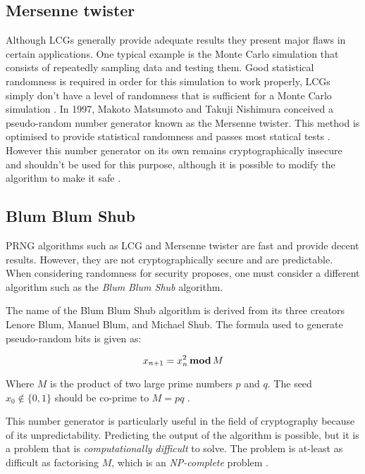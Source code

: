 \subsection{Mersenne twister}
Although LCGs generally provide adequate results they present major flaws in certain applications. One typical example is the Monte Carlo simulation that consists of repeatedly sampling data and testing them. Good statistical randomness is required in order for this simulation to work properly, LCGs simply don't have a level of randomness that is sufficient for a Monte Carlo simulation \citep{Itan-MonteCarlo}. In 1997, Makoto Matsumoto and Takuji Nishimura conceived a pseudo-random number generator known as the Mersenne twister. This method is optimised to provide statistical randomness and passes most statical tests \citep{DBLP:journals/tomacs/MatsumotoN98}. However this number generator on its own remains cryptographically insecure and shouldn't be used for this purpose, although it is possible to modify the algorithm to make it safe \citep{DBLP:journals/iacr/MatsumotoNHS05}.


\subsection{Blum Blum Shub}
PRNG algorithms such as LCG and Mersenne twister are fast and provide decent results. However, they are not cryptographically secure and are predictable. When considering randomness for security proposes, one must consider a different algorithm such as the {\em Blum Blum Shub} algorithm.

The name of the Blum Blum Shub algorithm is derived from its three creators Lenore Blum, Manuel Blum, and Michael Shub. \citep{BlumBlumShub-1} The formula used to generate pseudo-random bits is given as:

\[x_{n+1} = x^2_n \, \textbf{mod} \, M \]

Where $M$ is the product of two large prime numbers $p$ and $q$. The seed \(x_0 \notin \{0,1\} \) should be co-prime to $M = pq$ \citep{BlumBlumShub-2}.

This number generator is particularly useful in the field of cryptography because of its unpredictability. Predicting the output of the algorithm is possible, but it is a problem that is {\em computationally difficult} to solve. The problem is at-least as difficult as factorising $M$, which is an {\em NP-complete} problem \citep{BlumBlumShub-1}.

\pagebreak